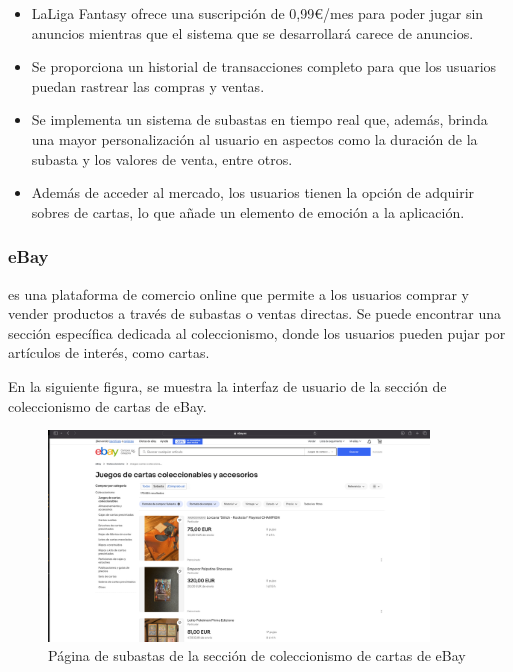 \begin{itemize}
    \item LaLiga Fantasy ofrece una suscripción de 0,99€/mes para poder jugar sin anuncios mientras que el sistema que se desarrollará carece de anuncios.
    \item Se proporciona un historial de transacciones completo para que los usuarios puedan rastrear las compras y ventas.
    \item Se implementa un sistema de subastas en tiempo real que, además, brinda una mayor personalización al usuario en aspectos como la duración de la subasta y los valores de venta, entre otros.
    \item Además de acceder al mercado, los usuarios tienen la opción de adquirir sobres de cartas, lo que añade un elemento de emoción a la aplicación.
\end{itemize}

\subsubsection{eBay}
 es una plataforma de comercio online que permite a los usuarios comprar y vender productos a través de subastas o ventas directas. Se puede encontrar una sección específica dedicada al coleccionismo, donde los usuarios pueden pujar por artículos de interés, como cartas.

En la siguiente figura, se muestra la interfaz de usuario de la sección de coleccionismo de cartas de eBay.
\begin{figure}[H]
    \centering
    \includegraphics[width=0.9\textwidth]{figures/4-Estudio-viabilidad/4_Ebay.png}
    \caption{Página de subastas de la sección de coleccionismo de cartas de eBay}
    \label{fig:ebay}
    \hypertarget{fig:ebay}{}
\end{figure} 

